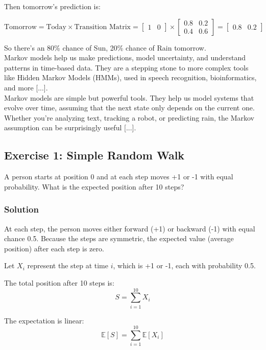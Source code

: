 \documentclass{book}
\begin{document}
Then tomorrow’s prediction is:

\[
\text{Tomorrow} = \text{Today} \times \text{Transition Matrix} = 
\begin{bmatrix} 1 & 0 \end{bmatrix} \times
\begin{bmatrix}
0.8 & 0.2 \\
0.4 & 0.6
\end{bmatrix}
=
\begin{bmatrix}
0.8 & 0.2
\end{bmatrix}
\]

So there's an 80\% chance of Sun, 20\% chance of Rain tomorrow.\\

Markov models help us make predictions, model uncertainty, and understand patterns in time-based data. They are a stepping stone to more complex tools like Hidden Markov Models (HMMs), used in speech recognition, bioinformatics, and more [...].\\

Markov models are simple but powerful tools. They help us model systems that evolve over time, assuming that the next state only depends on the current one. Whether you’re analyzing text, tracking a robot, or predicting rain, the Markov assumption can be surprisingly useful [...].

\newpage

\subsection*{Exercise 1: Simple Random Walk}
A person starts at position 0 and at each step moves +1 or -1 with equal probability. What is the expected position after 10 steps?

\subsubsection*{Solution}
At each step, the person moves either forward (+1) or backward (-1) with equal chance 0.5. Because the steps are symmetric, the expected value (average position) after each step is zero.

Let $X_i$ represent the step at time $i$, which is +1 or -1, each with probability 0.5.

The total position after 10 steps is:
\[
S = \sum_{i=1}^{10} X_i
\]

The expectation is linear:
\[
\mathbb{E}[S] = \sum_{i=1}^{10} \mathbb{E}[X_i]
\]
\end{document}
